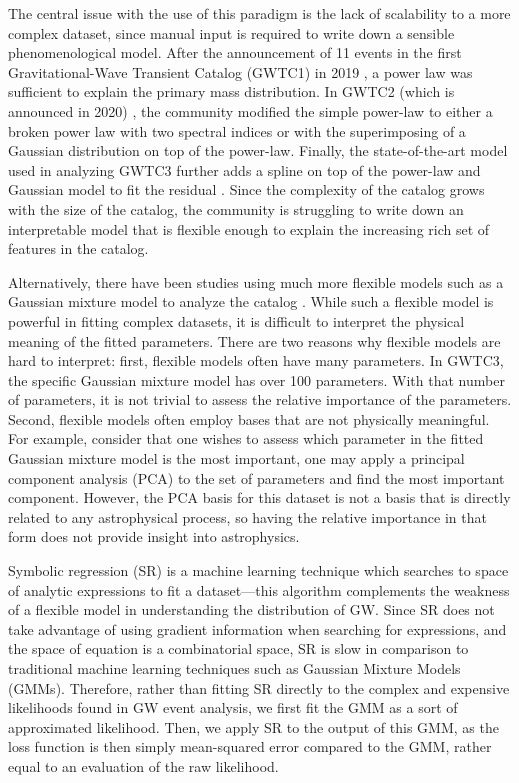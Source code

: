 \documentclass[nohyperref]{article}
\theoremstyle{plain}
\theoremstyle{definition}
\theoremstyle{remark}
\begin{document}
The central issue with the use of this paradigm is the lack of scalability to a more complex dataset, since manual input is required to write down a sensible phenomenological model.
After the announcement of 11 events in the first Gravitational-Wave Transient Catalog (GWTC1) in 2019 \cite{LIGOScientific:2018mvr}, a power law was sufficient to explain the primary mass distribution.
In GWTC2 (which is announced in 2020) \cite{LIGOScientific:2020kqk}, the community modified the simple power-law to either a broken power law with two spectral indices or with the superimposing of a Gaussian distribution on top of the power-law.
Finally, the state-of-the-art model used in analyzing GWTC3 \cite{LIGOScientific:2021psn} further adds a spline on top of the power-law and Gaussian model to fit the residual \cite{Edelman:2021zkw}.
Since the complexity of the catalog grows with the size of the catalog,
the community is struggling to write down an interpretable model that is flexible enough to explain the increasing rich set of features in the catalog. 


Alternatively, there have been studies using much more flexible models such as a Gaussian mixture model to analyze the catalog \cite{Tiwari:2020vym}.
While such a flexible model is powerful in fitting complex datasets,
it is difficult to interpret the physical meaning of the fitted parameters.
There are two reasons why flexible models are hard to interpret:
first, flexible models often have many parameters.
In GWTC3, the specific Gaussian mixture model has over 100 parameters.
With that number of parameters, it is not trivial to assess the relative importance of the parameters.
Second, flexible models often employ bases that are not physically meaningful.
For example, consider that one wishes to assess which parameter in the fitted Gaussian mixture model is the most important, one may apply a principal component analysis (PCA) to the set of parameters and find the most important component.
However, the PCA basis for this dataset is not a basis that is directly related to any astrophysical process,
so having the relative importance in that form does not provide insight into astrophysics.

Symbolic regression (SR) is a machine learning technique which searches to space of analytic expressions to fit a dataset---this algorithm complements the weakness of a flexible model in understanding the distribution of GW.
Since SR does not take advantage of using gradient information when searching for expressions,
and the space of equation is a combinatorial space,
SR is slow in comparison to traditional machine learning techniques such as Gaussian Mixture Models (GMMs).
Therefore, rather than fitting SR directly to the complex and expensive likelihoods found in GW event analysis, we first fit the GMM as a sort of approximated likelihood.
Then, we apply SR to the output of this GMM, as the loss function is then simply mean-squared error compared to the GMM, rather equal to an evaluation of the raw likelihood.
\end{document}
